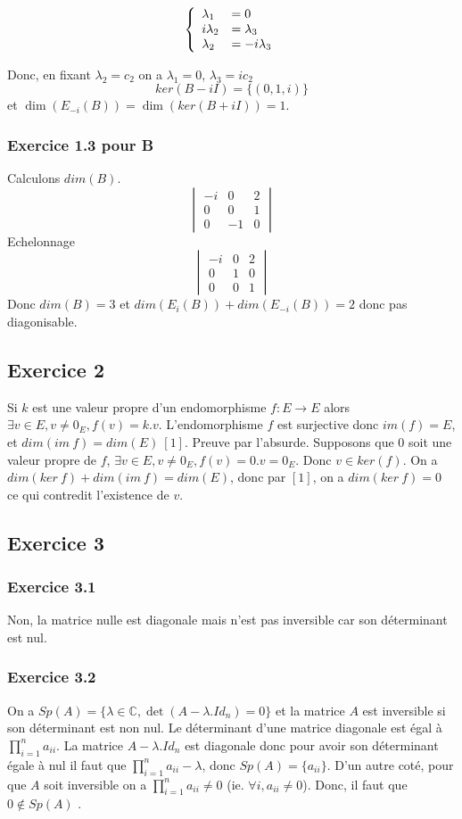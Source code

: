 \documentclass[]{book}
\theoremstyle{definition}
\newcommand{\bb}[1]{\mathbb{#1}}
\newcommand{\C}{\bb{C}}
\begin{document}
$$
\left\{ 
\begin{array}{l l}
\lambda_{1}  & = 0\\
i\lambda_{2}  & = \lambda_{3}\\
\lambda_{2}  & = - i\lambda_{3}\\
\end{array}
\right. 
$$ 

Donc, en fixant $\lambda_2 = c_2$ on a $\lambda_1 = 0$, $\lambda_3 = ic_2$
$$ker(B-iI) = \{(0,1,i)\}$$ 
et $\dim(E_{-i}(B))= \dim(ker(B+iI)) = 1$.


\subsubsection*{Exercice 1.3 pour B}
Calculons $dim(B)$.
$$\begin{vmatrix} -i & 0 & 2 \\ 0 & 0 & 1 \\ 0 & -1 & 0 \end{vmatrix}$$
Echelonnage
$$\begin{vmatrix} -i & 0 & 2  \\ 0 & 1 & 0 \\ 0 & 0 & 1 \end{vmatrix}$$
Donc $dim(B)=3$ et $dim(E_{i}(B))+dim(E_{-i}(B)) = 2$ donc pas diagonisable. 


\subsection*{Exercice 2}
Si $k$ est une valeur propre d'un endomorphisme $f:E \to E$ alors $\exists v \in E, v \neq 0_E, f(v) = k.v$. L'endomorphisme $f$ est surjective donc $im(f) = E$, et $dim(im\ f) = dim(E)\ [1]$. Preuve par l'absurde. Supposons que 0 soit une valeur propre de $f$, $\exists v \in E, v \neq 0_E, f(v) = 0.v = 0_E$. Donc $v \in ker(f)$. On a $dim(ker\ f) + dim(im\ f) = dim(E)$, donc par $[1]$, on a $dim(ker\ f) = 0$ ce qui contredit l'existence de $v$. 


\subsection*{Exercice 3}
\subsubsection*{Exercice 3.1}
Non, la matrice nulle est diagonale mais n'est pas inversible car son d\'eterminant est nul.

\subsubsection*{Exercice 3.2}
On a $Sp(A)=\{\lambda \in \C, \det(A-\lambda.Id_n) = 0\}$ et la matrice $A$ est inversible si son d\'eterminant est non nul. Le d\'eterminant d'une matrice diagonale est \'egal \`a $\prod_{i=1}^{n}{a_{ii}}$. La matrice $A-\lambda.Id_n$ est diagonale donc pour avoir son d\'eterminant \'egale \`a nul il faut que $\prod_{i=1}^{n}{a_{ii}-\lambda}$, donc $Sp(A)= \{a_{ii}\}$. D'un autre cot\'e, pour que $A$ soit inversible on a $\prod_{i=1}^{n}{a_{ii}} \neq 0$ (ie. $\forall i, a_{ii} \neq 0$). Donc, il faut que $0 \not \in Sp(A)$ .
\end{document}
